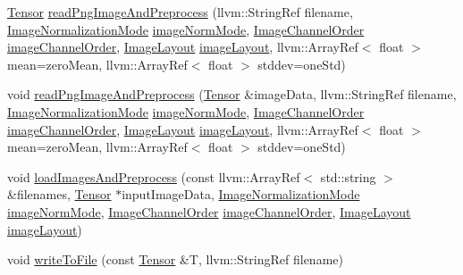\begin{DoxyCompactItemize}
\hyperlink{classglow_1_1_tensor}{Tensor} \hyperlink{namespaceglow_aa05ae0a1df66d2a01e935bcfa21e1874}{read\+Png\+Image\+And\+Preprocess} (llvm\+::\+String\+Ref filename, \hyperlink{namespaceglow_af836699afb1d36a88df0d50d74fde931}{Image\+Normalization\+Mode} \hyperlink{namespaceglow_ad1aa614344d723c1b14942f55e0a92b4}{image\+Norm\+Mode}, \hyperlink{namespaceglow_a2747942676633510584a944637b8eb59}{Image\+Channel\+Order} \hyperlink{namespaceglow_a3f89e6d465a90abbf0dd62935035c1de}{image\+Channel\+Order}, \hyperlink{namespaceglow_a06c384b9844d09e4dd277eb509728dce}{Image\+Layout} \hyperlink{namespaceglow_a53107002ac2c9f4c49145ee80843a1da}{image\+Layout}, llvm\+::\+Array\+Ref$<$ float $>$ mean=zero\+Mean, llvm\+::\+Array\+Ref$<$ float $>$ stddev=one\+Std)
\item 
void \hyperlink{namespaceglow_a4355b249e26c8744ca54250df4d12f89}{read\+Png\+Image\+And\+Preprocess} (\hyperlink{classglow_1_1_tensor}{Tensor} \&image\+Data, llvm\+::\+String\+Ref filename, \hyperlink{namespaceglow_af836699afb1d36a88df0d50d74fde931}{Image\+Normalization\+Mode} \hyperlink{namespaceglow_ad1aa614344d723c1b14942f55e0a92b4}{image\+Norm\+Mode}, \hyperlink{namespaceglow_a2747942676633510584a944637b8eb59}{Image\+Channel\+Order} \hyperlink{namespaceglow_a3f89e6d465a90abbf0dd62935035c1de}{image\+Channel\+Order}, \hyperlink{namespaceglow_a06c384b9844d09e4dd277eb509728dce}{Image\+Layout} \hyperlink{namespaceglow_a53107002ac2c9f4c49145ee80843a1da}{image\+Layout}, llvm\+::\+Array\+Ref$<$ float $>$ mean=zero\+Mean, llvm\+::\+Array\+Ref$<$ float $>$ stddev=one\+Std)
\item 
void \hyperlink{namespaceglow_ae5f1717e58e71e730005473efae8c91a}{load\+Images\+And\+Preprocess} (const llvm\+::\+Array\+Ref$<$ std\+::string $>$ \&filenames, \hyperlink{classglow_1_1_tensor}{Tensor} $\ast$input\+Image\+Data, \hyperlink{namespaceglow_af836699afb1d36a88df0d50d74fde931}{Image\+Normalization\+Mode} \hyperlink{namespaceglow_ad1aa614344d723c1b14942f55e0a92b4}{image\+Norm\+Mode}, \hyperlink{namespaceglow_a2747942676633510584a944637b8eb59}{Image\+Channel\+Order} \hyperlink{namespaceglow_a3f89e6d465a90abbf0dd62935035c1de}{image\+Channel\+Order}, \hyperlink{namespaceglow_a06c384b9844d09e4dd277eb509728dce}{Image\+Layout} \hyperlink{namespaceglow_a53107002ac2c9f4c49145ee80843a1da}{image\+Layout})
\item 
void \hyperlink{namespaceglow_a5605652aaef5081976134120c3dcd4d5}{write\+To\+File} (const \hyperlink{classglow_1_1_tensor}{Tensor} \&T, llvm\+::\+String\+Ref filename)
\item 

\end{DoxyCompactItemize}

